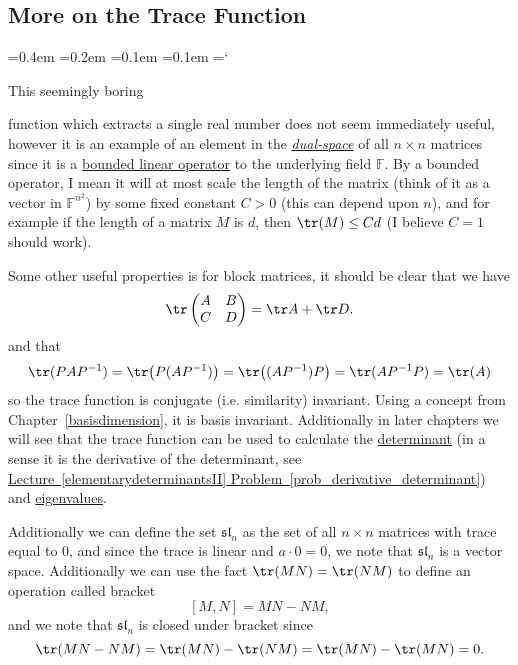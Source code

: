 
\subsection{More on the Trace Function}

{\ttfamily
{}\font=0.4em
\font=0.2em
\font=0.1em
\font=0.1em
\hyphenchar\font=`\-


\hypertarget{scripts_properties_of_matrices_trace}{This seemingly boring} function which extracts a single real number does not seem immediately useful, however it is an example of an element in the \href{http://en.wikipedia.org/wiki/Dual_space}{\emph{dual-space}} of all $n \times n$ matrices since it is a \href{http://en.wikipedia.org/wiki/Bounded_operator}{bounded linear operator} to the underlying field $\mathbb{F}$. By a bounded operator, I mean it will at most scale the length of the matrix (think of it as a vector in $\mathbb{F}^{n^2}$) by some fixed constant $C > 0$ (this can depend upon $n$), and for example if the length of a matrix $M$ is $d$, then $\tr(M) \leq C d$ (I believe $C = 1$ should work).

Some other useful properties is for block matrices, it should be clear that we have
\[
\tr \begin{pmatrix} A & B \\ C & D \end{pmatrix} = \tr A + \tr D.
\]
and that
\[
\tr(P A P^{-1}) = \tr\bigl(P(AP^{-1})\bigr) = \tr\bigl((AP^{-1})P \bigr) = \tr(A P^{-1}P) = \tr(A)
\]
so the trace function is conjugate (i.e. similarity) invariant. Using a concept from Chapter~\ref{basisdimension}, it is basis invariant. Additionally in later chapters we will see that the trace function can be used to calculate the \hyperref[elementarydeterminants]{determinant} (in a sense it is the derivative of the determinant, see \hyperref[prob_derivative_determinant]{Lecture~\ref*{elementarydeterminantsII} Problem~\ref*{prob_derivative_determinant}}) and \hyperref[eigenvalseigenvects]{eigenvalues}.

Additionally we can define the set $\mathfrak{sl}_n$ as the set of all $n \times n$ matrices with trace equal to 0, and since the trace is linear and $a \cdot 0 = 0$, we note that $\mathfrak{sl}_n$ is a vector space. Additionally we can use the fact $\tr(MN) = \tr(NM)$ to define an operation called bracket
\[
[M,N] = MN - NM,
\]
and we note that $\mathfrak{sl}_n$ is closed under bracket since
\[
\tr(MN - NM) = \tr(MN) - \tr(NM) = \tr(MN) - \tr(MN) = 0.
\]

} %

\newpage
